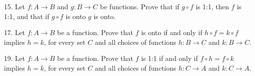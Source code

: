 \begin{mdframed}[style=darkAnswer,frametitle={Joe Starr}]

\end{mdframed}
\newpage
\begin{mdframed}[style=darkQuesion]
  15. Let $f:A\to B$ and $g:B\to C$ be functions. Prove that if $g\circ f$ is 
  1:1, then $f$ is 1:1, and that if $g\circ f$ is onto $g$ is onto.
\end{mdframed}

\begin{mdframed}[style=darkAnswer,frametitle={Joe Starr}]

\end{mdframed}
\newpage
\begin{mdframed}[style=darkQuesion]
  17. Let $f:A\to B$ be a function. Prove that $f$ is onto if and only if 
  $h\circ f = k \circ f$ implies $h=k$, for every set $C$ and all choices of 
  functions $h:B\to C$ and $k:B\to C$.
\end{mdframed}

\begin{mdframed}[style=darkAnswer,frametitle={Joe Starr}]

\end{mdframed}
\newpage
\begin{mdframed}[style=darkQuesion]
  19. Let $f:A\to B$ be a function. Prove that $f$ is 1:1 if and only if 
  $f\circ h=f\circ k$ implies $h=k$, for every set $C$ and all choices of 
  functions $h:C\to A$ and $k:C\to A$.
\end{mdframed}
  
